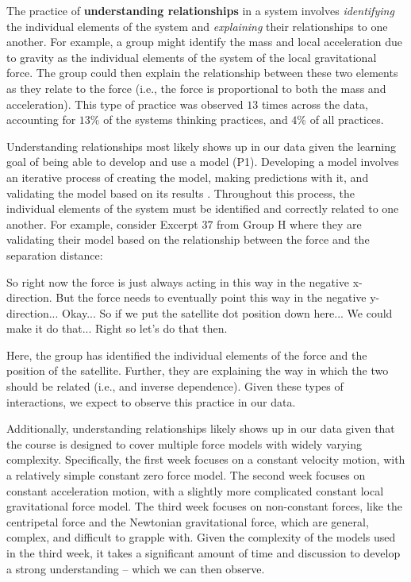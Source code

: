\documentclass{msuphddissertation}
\begin{document}
\begin{doublespace}
%
%
%

The practice of \textbf{understanding relationships} in a system involves \textit{identifying} the individual elements of the system and \textit{explaining} their relationships to one another.  For example, a group might identify the mass and local acceleration due to gravity as the individual elements of the system of the local gravitational force.  The group could then explain the relationship between these two elements as they relate to the force (i.e., the force is proportional to both the mass and acceleration).  This type of practice was observed $13$ times across the data, accounting for $13\%$ of the systems thinking practices, and $4\%$ of all practices.

Understanding relationships most likely shows up in our data given the learning goal of being able to develop and use a model (P1).  Developing a model involves an iterative process of creating the model, making predictions with it, and validating the model based on its results \cite{AAPT2016}.  Throughout this process, the individual elements of the system must be identified and correctly related to one another.  For example, consider Excerpt 37 from Group H where they are validating their model based on the relationship between the force and the separation distance: \begin{description}
\SC So right now the force is just always acting in this way {in the negative x-direction}.
\SC But the force needs to eventually point this way {in the negative y-direction}...
\SB Okay...
\SC So if we put the satellite dot position down here...
\SC We could make it do that...
\SA Right so let's do that then.
\end{description}  Here, the group has identified the individual elements of the force and the position of the satellite.  Further, they are explaining the way in which the two should be related (i.e., and inverse dependence).  Given these types of interactions, we expect to observe this practice in our data.

Additionally, understanding relationships likely shows up in our data given that the course is designed to cover multiple force models with widely varying complexity.  Specifically, the first week focuses on a constant velocity motion, with a relatively simple constant zero force model.  The second week focuses on constant acceleration motion, with a slightly more complicated constant local gravitational force model.  The third week focuses on non-constant forces, like the centripetal force and the Newtonian gravitational force, which are general, complex, and difficult to grapple with.  Given the complexity of the models used in the third week, it takes a significant amount of time and discussion to develop a strong understanding -- which we can then observe.


\end{doublespace}
\end{document}
